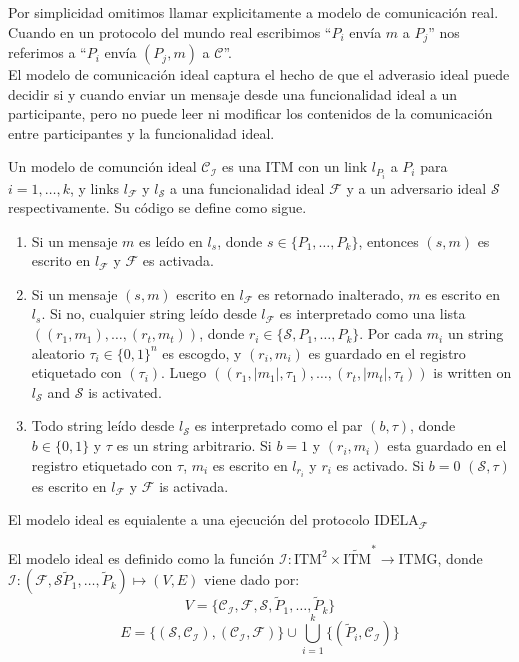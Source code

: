 Por simplicidad omitimos llamar explicitamente a modelo de comunicación real.
Cuando en un protocolo del mundo real escribimos ``$P_i$ envía $m$ a $P_j$''
nos referimos a ``$P_i$ envía $(P_j, m)$ a $\mathcal{C}$''.\\
El modelo de comunicación ideal captura el hecho de que el adverasio ideal puede
decidir si y cuando enviar un mensaje desde una funcionalidad ideal a un participante,
pero no puede leer ni modificar los contenidos de la comunicación entre participantes
y la funcionalidad ideal.

\begin{definicion}
Un modelo de comunción ideal $\mathcal{C_I}$ es una ITM con un link $l_{P_i}$ a 
$P_i$ para $i = 1, \ldots, k$,
y links $l_\mathcal{F}$ y $l_\mathcal{S}$ a una funcionalidad ideal $\mathcal{F}$
y a un adversario ideal $\mathcal{S}$ respectivamente. Su código se define como sigue.
\begin{enumerate}
  \item Si un mensaje $m$ es leído en $l_s$, donde $s \in \{P_1, \ldots, P_k\}$,
        entonces $(s, m)$ es escrito en $l_\mathcal{F}$ y $\mathcal{F}$ es activada.
  \item Si un mensaje $(s, m)$ escrito en $l_\mathcal{F}$ es retornado inalterado, $m$ es
        escrito en $l_s$. Si no, cualquier string leído desde $l_\mathcal{F}$ es interpretado
        como una lista $((r_1, m_1), \ldots, (r_t, m_t))$, donde $r_i \in \{\mathcal{S},
        P_1, \ldots, P_k\}$. Por cada $m_i$ un string aleatorio $\tau_i \in \{0, 1\}^n$ es
        escogdo, y $(r_i, m_i)$ es guardado en el registro etiquetado con $(\tau_i)$. Luego
        $((r_1, |m_1|, \tau_1), \ldots, (r_t, |m_t|, \tau_t))$ is
        written on $l_\mathcal{S}$ and $\mathcal{S}$ is activated.
  \item Todo string leído desde $l_\mathcal{S}$ es interpretado como el par $(b, \tau)$, donde
        $b \in \{0, 1\}$ y $\tau$ es un string arbitrario. Si $b = 1$ y $(r_i, m_i)$
        esta guardado en el registro etiquetado con $\tau$, $m_i$ es escrito en $l_{r_i}$
        y $r_i$ es activado. Si $b = 0$ $(\mathcal{S}, \tau)$ es escrito en
        $l_\mathcal{F}$ y $\mathcal{F}$ is activada.
\end{enumerate}
\end{definicion}

El modelo ideal es equialente a una ejecución del protocolo $\textrm{IDELA}_{\mathcal{F}}$

\begin{definicion}
El modelo ideal es definido como la función $\mathcal{I}:\textrm{ITM}^2 \times
\tilde{\textrm{ITM}}^* \to \textrm{ITMG}$, donde $\mathcal{I}: (\mathcal{F}, \mathcal{S}
\tilde{P}_1, \ldots, \tilde{P}_k) \mapsto (V, E)$ viene dado por:
$$V = \{\mathcal{C_I}, \mathcal{F}, \mathcal{S}, \tilde{P}_1, \ldots, \tilde{P}_k\}$$
$$E = \{(\mathcal{S}, \mathcal{C_I}), (\mathcal{C_I}, \mathcal{F})\} \cup
\bigcup_{i = 1}^{k}\{(\tilde{P}_i, \mathcal{C_I})\}$$
\end{definicion}

